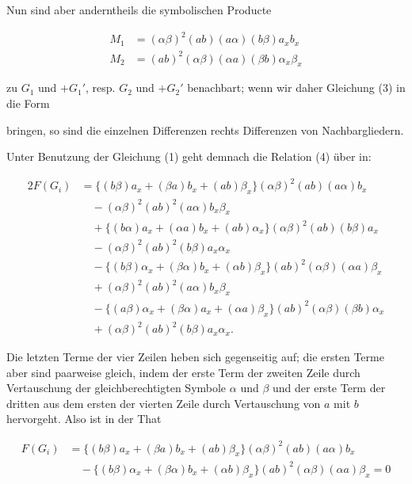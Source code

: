 Nun sind aber anderntheils die symbolischen Producte

\[
\begin{aligned}
M_1 &{}= (\alpha\beta)^2 (ab)(a\alpha)(b\beta)a_xb_x\\
M_2 &{}= (ab)^2 (\alpha\beta)(\alpha a)(\beta b)\alpha_x\beta_x
\end{aligned}
\]

zu $G_1$ und $+G_1'$, resp. $G_2$ und $+G_2'$ benachbart; wenn wir daher
Gleichung (3) in die Form


bringen, so sind die einzelnen Differenzen rechts Differenzen von
Nachbargliedern.

Unter Benutzung der Gleichung (1) geht demnach die Relation (4)
über in:

\[
\begin{aligned}
2F(G_i) &{}= \{(b\beta)a_x + (\beta a)b_x + (ab)\beta_x\}(\alpha\beta)^2(ab)(a\alpha)b_x\\
&{}\quad - (\alpha\beta)^2(ab)^2(a\alpha)b_x\beta_x\\
&{}\quad + \{(b\alpha)a_x + (\alpha a)b_x + (ab)\alpha_x\}(\alpha\beta)^2(ab)(b\beta)a_x\\
&{}\quad - (\alpha\beta)^2(ab)^2(b\beta)a_x\alpha_x\\
&{}\quad - \{(b\beta)\alpha_x + (\beta\alpha)b_x + (\alpha b)\beta_x\}(ab)^2(\alpha\beta)(\alpha a)\beta_x
\\
&{}\quad + (\alpha\beta)^2(ab)^2(a\alpha)b_x\beta_x\\
&{}\quad - \{(a\beta)\alpha_x + (\beta\alpha)a_x + (\alpha a)\beta_x\}(ab)^2(\alpha\beta)(\beta b)\alpha_x\\
&{}\quad + (\alpha\beta)^2(ab)^2(b\beta)a_x\alpha_x.
\end{aligned}
\]

Die letzten Terme der vier Zeilen heben sich gegenseitig auf; die
ersten Terme aber sind paarweise gleich, indem der erste Term der
zweiten Zeile durch Vertauschung der gleichberechtigten Symbole $\alpha$
und $\beta$ und der erste Term der dritten aus dem ersten der vierten
Zeile durch Vertauschung von $a$ mit $b$ hervorgeht. Also ist in der
That

\[
\begin{aligned}
F(G_i) &{}= \{(b\beta)a_x + (\beta a)b_x + (ab)\beta_x\}(\alpha\beta)^2(ab)(a\alpha)b_x\\
&{}\quad - \{(b\beta)\alpha_x + (\beta\alpha)b_x + (\alpha b)\beta_x\}(ab)^2(\alpha\beta)(\alpha a)\beta_x = 0
\end{aligned}
\]

